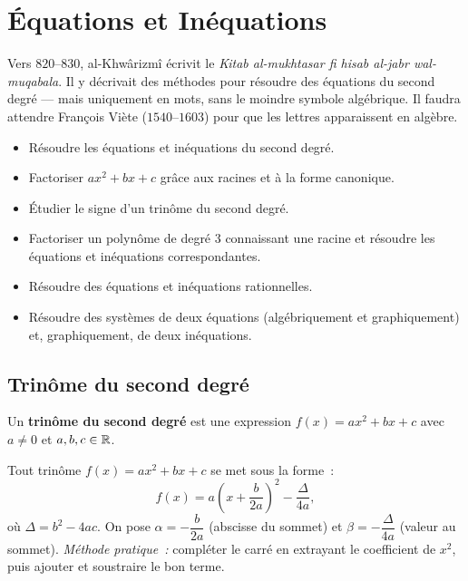 \chapter{\'Equations et In\'equations}


\begin{anecdote}
Vers $820$--$830$, al-Khw\^{a}rizm\^{i} \'ecrivit le \textit{Kitab al-mukhtasar fi hisab
al-jabr wal-muqabala}. Il y d\'ecrivait des m\'ethodes pour r\'esoudre des \'equations
du second degr\'e --- mais uniquement en mots, sans le moindre symbole alg\'ebrique.
Il faudra attendre Fran\c{c}ois Vi\`ete ($1540$--$1603$) pour que les lettres
apparaissent en alg\`ebre.
\end{anecdote}

\begin{objectifs}
\begin{itemize}
  \item R\'esoudre les \'equations et in\'equations du second degr\'e.
  \item Factoriser $ax^2+bx+c$ gr\^ace aux racines et \`a la forme canonique.
  \item \'Etudier le signe d'un trin\^{o}me du second degr\'e.
  \item Factoriser un polyn\^ome de degr\'e 3 connaissant une racine et r\'esoudre
        les \'equations et in\'equations correspondantes.
  \item R\'esoudre des \'equations et in\'equations rationnelles.
  \item R\'esoudre des syst\`emes de deux \'equations (alg\'ebriquement et
        graphiquement) et, graphiquement, de deux in\'equations.
\end{itemize}
\end{objectifs}

\section{Trin\^{o}me du second degr\'e}

\begin{defn}[Trin\^{o}me]
Un \textbf{trin\^{o}me du second degr\'e} est une expression $f(x) = ax^2+bx+c$
avec $a \ne 0$ et $a,b,c \in \mathbb{R}$.
\end{defn}

\begin{methode}
Tout trin\^ome $f(x)=ax^2+bx+c$ se met sous la forme~:
$$f(x) = a\!\left(x + \frac{b}{2a}\right)^2 - \frac{\Delta}{4a},$$
o\`u $\Delta = b^2 - 4ac$. On pose $\alpha = -\dfrac{b}{2a}$ (abscisse du sommet)
et $\beta = -\dfrac{\Delta}{4a}$ (valeur au sommet).
\emph{M\'ethode pratique~:} compl\'eter le carr\'e en extrayant le coefficient
de $x^2$, puis ajouter et soustraire le bon terme.
\end{methode}

